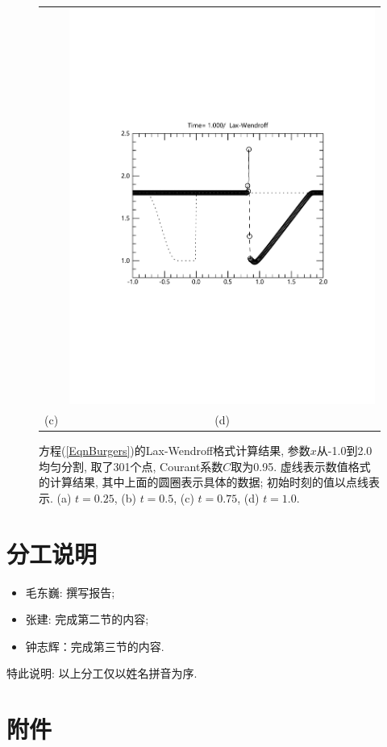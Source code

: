 \documentclass[10.5pt
]{article}
\begin{document}
\begin{figure}[htb]
\begin{center}
\begin{tabular}{cc}
			&
			\includegraphics[width=.45\textwidth]{fig2_2_4}
			\\[-10pt]
			(c) & (d)
		\end{tabular}
	\end{center}
	\caption{%
		方程(\ref{EqnBurgers})的Lax-Wendroff格式计算结果, 参数$x$从-1.0到2.0均匀分割, 取了301个点, Courant系数$C$取为0.95. 虚线表示数值格式的计算结果, 其中上面的圆圈表示具体的数据; 初始时刻的值以点线表示. (a) $t=0.25$, (b) $t=0.5$, (c) $t=0.75$, (d) $t=1.0$.}
	\label{BurgersL}
\end{figure}

\section*{分工说明}

\begin{itemize}
	\item 毛东巍: 撰写报告;
	\item 张建: 完成第二节的内容;
	\item 钟志辉：完成第三节的内容.
\end{itemize}
特此说明: 以上分工仅以姓名拼音为序.
\section*{附件}
\end{document}
